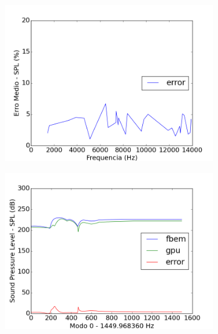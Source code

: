 \begin{figure}[ht]
\centering
\begin{subfigure}{0.6\textwidth}
\centering
\includegraphics[width=\textwidth]{../data/transfer_test/ceramic_mug/plots/ceramic_mug_error.png}
\end{subfigure}
\begin{subfigure}{0.45\textwidth}
	\centering
	\includegraphics[width=\textwidth]{../data/transfer_test/ceramic_mug/plots/ceramic_mug-tfv-0_0.png}
	\caption{}
	\label{fig:coef_mug_0}
\end{subfigure}%
\begin{subfigure}{0.45\textwidth}
	\centering

\end{subfigure}
\end{figure}
